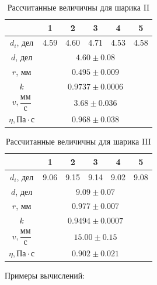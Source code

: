 \documentclass{article}
\begin{document}
\begin{table}[H]
   \centering
   \begin{tabular}{|c|c|c|c|c|c|} \hline
       & 1 & 2 & 3 & 4 & 5 \\ \hline
       $d_i$, дел & 4.59 & 4.60 & 4.71 & 4.53 & 4.58 \\ \hline
       $d$, дел & \multicolumn{5}{|c|}{$4.60 \pm 0.08$} \\ \hline
       $r$, мм & \multicolumn{5}{|c|}{$0.495 \pm 0.009$} \\ \hline
       $k$ & \multicolumn{5}{|c|}{$0.9737 \pm 0.0006$} \\ \hline
       $v , \dfrac{ \text{мм}}{ \text{с}}$ & \multicolumn{5}{|c|}{$3.68 \pm 0.036$} \\ \hline
       $\eta , \text{Па}\cdot\text{с}$ &  \multicolumn{5}{|c|}{$0.968 \pm 0.038$} \\ \hline 
   \end{tabular}
   \caption{Рассчитанные величичны для шарика II}
\end{table}

\begin{table}[H]
   \centering
   \begin{tabular}{|c|c|c|c|c|c|} \hline
       & 1 & 2 & 3 & 4 & 5 \\ \hline
       $d_i$, дел & 9.06 & 9.15 & 9.14 & 9.02 & 9.08 \\ \hline
       $d$, дел & \multicolumn{5}{|c|}{$9.09 \pm 0.07$} \\ \hline
       $r$, мм & \multicolumn{5}{|c|}{$0.977 \pm 0.007$} \\ \hline
       $k$ & \multicolumn{5}{|c|}{$0.9494 \pm 0.0007$} \\ \hline
       $v , \dfrac{ \text{мм}}{ \text{с}}$ & \multicolumn{5}{|c|}{$15.00 \pm 0.15$} \\ \hline
       $\eta , \text{Па}\cdot\text{с}$ &  \multicolumn{5}{|c|}{$0.902 \pm 0.021$} \\ \hline 
   \end{tabular}
   \caption{Рассчитанные величичны для шарика III}
\end{table}

Примеры вычислений:
\end{document}
